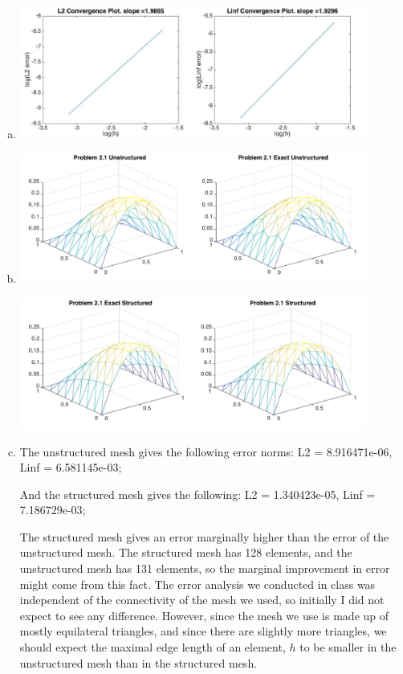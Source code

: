 \documentclass[11pt]{article}
\begin{document}
\begin{enumerate}[(a)]
\item

\begin{center}
\includegraphics[width=0.9\textwidth]{err.png}
\end{center}

\item

\begin{center}
\includegraphics[width=0.9\textwidth]{21du.png}
\end{center}

\begin{center}
\includegraphics[width=0.9\textwidth]{21ds.jpg}
\end{center}

\item
The unstructured mesh gives the following error norms: L2 = 8.916471e-06, Linf = 6.581145e-03;

And the structured mesh gives the following: 	L2 = 1.340423e-05, Linf = 7.186729e-03;

The structured mesh gives an error marginally higher than the error of the unstructured mesh. The structured mesh has 128 elements, and the unstructured mesh has 131 elements, so the marginal improvement in error might come from this fact. The error analysis we conducted in class was independent of the connectivity of the mesh we used, so initially I did not expect to see any difference. However, since the mesh we use is made up of mostly equilateral triangles, and since there are slightly more triangles, we should expect the maximal edge length of an element, $h$ to be smaller in the unstructured mesh than in the structured mesh. 


\end{enumerate}
\end{document}
